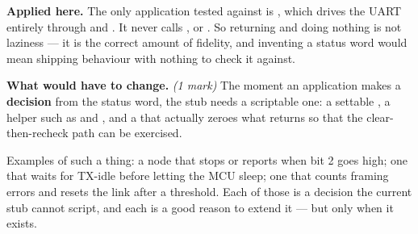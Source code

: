 \textbf{Applied here.} The only application tested against  is
, which drives the UART entirely through  and . It
never calls ,  or . So returning  and
doing nothing is not laziness --- it is the correct amount of fidelity, and inventing a status word
would mean shipping behaviour with nothing to check it against.

\textbf{What would have to change.} \textit{(1 mark)} The moment an application makes a
\textbf{decision} from the status word, the stub needs a scriptable one: a settable ,
a helper such as  and , and a
 that actually zeroes what  returns so that the
clear-then-recheck path can be exercised.

Examples of such a thing: a node that stops or reports when  bit 2 goes high; one that
waits for TX-idle before letting the MCU sleep; one that counts framing errors and resets the link
after a threshold. Each of those is a decision the current stub cannot script, and each is a good
reason to extend it --- but only when it exists.


